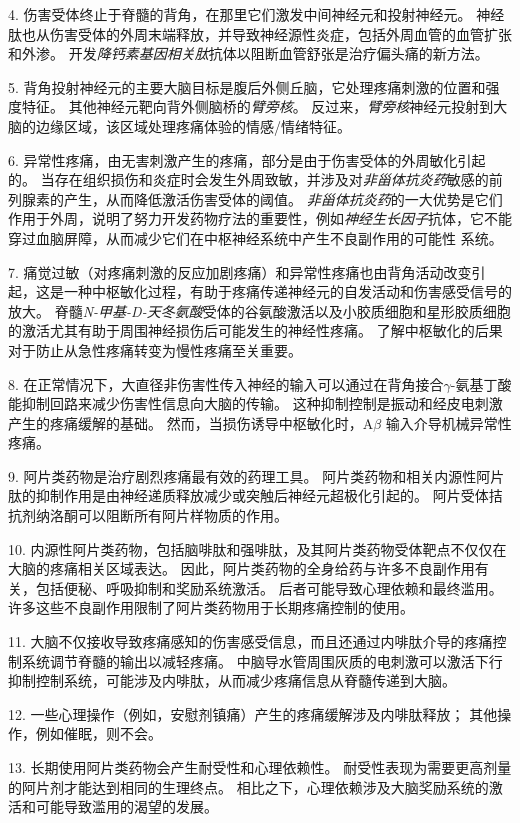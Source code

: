 4. 伤害受体终止于脊髓的背角，在那里它们激发中间神经元和投射神经元。
神经肽也从伤害受体的外周末端释放，并导致神经源性炎症，包括外周血管的血管扩张和外渗。
开发\textit{降钙素基因相关肽}抗体以阻断血管舒张是治疗偏头痛的新方法。 


5. 背角投射神经元的主要大脑目标是腹后外侧丘脑，它处理疼痛刺激的位置和强度特征。
其他神经元靶向背外侧脑桥的\textit{臂旁核}。
反过来，\textit{臂旁核}神经元投射到大脑的边缘区域，该区域处理疼痛体验的情感/情绪特征。
 

6. 异常性疼痛，由无害刺激产生的疼痛，部分是由于伤害受体的外周敏化引起的。
当存在组织损伤和炎症时会发生外周致敏，并涉及对\textit{非甾体抗炎药}敏感的前列腺素的产生，从而降低激活伤害受体的阈值。
\textit{非甾体抗炎药}的一大优势是它们作用于外周，说明了努力开发药物疗法的重要性，例如\textit{神经生长因子}抗体，它不能穿过血脑屏障，从而减少它们在中枢神经系统中产生不良副作用的可能性 系统。 


7. 痛觉过敏（对疼痛刺激的反应加剧疼痛）和异常性疼痛也由背角活动改变引起，这是一种中枢敏化过程，有助于疼痛传递神经元的自发活动和伤害感受信号的放大。
脊髓\textit{N-甲基-D-天冬氨酸}受体的谷氨酸激活以及小胶质细胞和星形胶质细胞的激活尤其有助于周围神经损伤后可能发生的神经性疼痛。
了解中枢敏化的后果对于防止从急性疼痛转变为慢性疼痛至关重要。 


8. 在正常情况下，大直径非伤害性传入神经的输入可以通过在背角接合$\gamma$-氨基丁酸能抑制回路来减少伤害性信息向大脑的传输。
这种抑制控制是振动和经皮电刺激产生的疼痛缓解的基础。
然而，当损伤诱导中枢敏化时，A$\beta$ 输入介导机械异常性疼痛。
 

9. 阿片类药物是治疗剧烈疼痛最有效的药理工具。
阿片类药物和相关内源性阿片肽的抑制作用是由神经递质释放减少或突触后神经元超极化引起的。
阿片受体拮抗剂纳洛酮可以阻断所有阿片样物质的作用。 


10. 内源性阿片类药物，包括脑啡肽和强啡肽，及其阿片类药物受体靶点不仅仅在大脑的疼痛相关区域表达。
因此，阿片类药物的全身给药与许多不良副作用有关，包括便秘、呼吸抑制和奖励系统激活。
后者可能导致心理依赖和最终滥用。
许多这些不良副作用限制了阿片类药物用于长期疼痛控制的使用。


11. 大脑不仅接收导致疼痛感知的伤害感受信息，而且还通过内啡肽介导的疼痛控制系统调节脊髓的输出以减轻疼痛。
中脑导水管周围灰质的电刺激可以激活下行抑制控制系统，可能涉及内啡肽，从而减少疼痛信息从脊髓传递到大脑。


12. 一些心理操作（例如，安慰剂镇痛）产生的疼痛缓解涉及内啡肽释放；
其他操作，例如催眠，则不会。


13. 长期使用阿片类药物会产生耐受性和心理依赖性。
耐受性表现为需要更高剂量的阿片剂才能达到相同的生理终点。
相比之下，心理依赖涉及大脑奖励系统的激活和可能导致滥用的渴望的发展。


